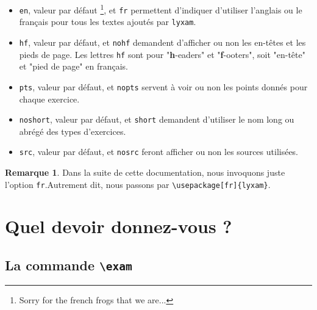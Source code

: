 \documentclass[12pt,a4paper]{scrartcl}
\theoremstyle{definition}
\newtheorem*{remark}{Remarque}
\begin{document}
\begin{itemize}[label=\textbullet]

	\item \verb+en+, valeur par défaut
	\footnote{
		Sorry for the french frogs that we are...
	}, et \verb+fr+ permettent d'indiquer d'utiliser l'anglais ou le français pour tous les textes ajoutés par \verb+lyxam+.

	\item \verb+hf+, valeur par défaut, et \verb+nohf+ demandent d'afficher ou non les en-têtes et les pieds de page.
	Les lettres \verb+hf+ sont pour "\textbf{h}-eaders" et "\textbf{f}-ooters", soit "en-tête" et "pied de page" en français.

	\item \verb+pts+, valeur par défaut, et \verb+nopts+ servent à voir ou non les points donnés pour chaque exercice.

	\item \verb+noshort+, valeur par défaut, et \verb+short+ demandent d'utiliser le nom long ou abrégé des types d'exercices.

	\item \verb+src+, valeur par défaut, et \verb+nosrc+ feront afficher ou non les sources utilisées.
\end{itemize}

\begin{remark}
	Dans la suite de cette documentation, nous invoquons juste l'option \verb+fr+.Autrement dit, nous passons par \verb+\usepackage[fr]{lyxam}+.
\end{remark}




\section{Quel devoir donnez-vous ?}

	\subsection{La commande \texttt{\textbackslash exam}}
\end{document}

